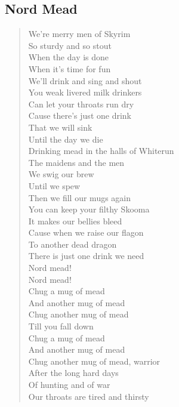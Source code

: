 \documentclass[11pt]{article}
\begin{document}
\subsection{Nord Mead}
\label{sec:orgac37ada}
\begin{verse}
We're merry men of Skyrim\\
So sturdy and so stout\\
When the day is done\\
When it's time for fun\\
We'll drink and sing and shout\\
\vspace*{1em}
You weak livered milk drinkers\\
Can let your throats run dry\\
Cause there's just one drink\\
That we will sink\\
Until the day we die\\
Drinking mead in the halls of Whiterun\\
The maidens and the men\\
We swig our brew\\
Until we spew\\
Then we fill our mugs again\\
\vspace*{1em}
You can keep your filthy Skooma\\
It makes our bellies bleed\\
Cause when we raise our flagon\\
To another dead dragon\\
There is just one drink we need\\
Nord mead!\\
Nord mead!\\
\vspace*{1em}
Chug a mug of mead\\
And another mug of mead\\
Chug another mug of mead\\
Till you fall down\\
Chug a mug of mead\\
And another mug of mead\\
Chug another mug of mead, warrior\\
\vspace*{1em}
After the long hard days\\
Of hunting and of war\\
Our throats are tired and thirsty\\

\end{verse}
\end{document}
